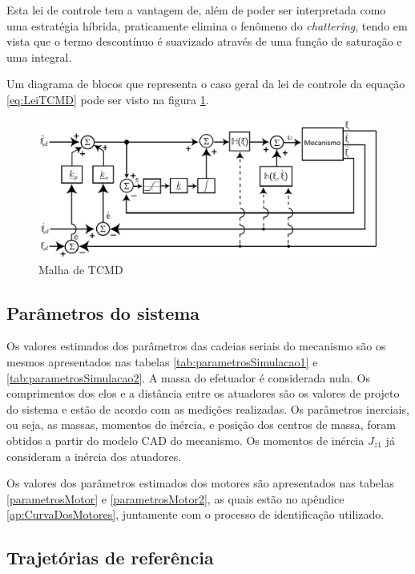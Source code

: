 \documentclass[]{politex}
\begin{document}
Esta lei de controle tem a vantagem de, além de poder ser interpretada como uma estratégia híbrida, praticamente elimina o fenômeno do \emph{chattering}, tendo em vista que o termo descontínuo é suavizado através de uma função de saturação e uma integral.

Um diagrama de blocos que representa o caso geral da lei de controle da equação \eqref{eq:LeiTCMD} pode ser visto na figura \ref{fig:TCMD}.
\begin{figure}[h]
	\centering
	\includegraphics[scale=0.39]{../figures/TCMD.jpg}  
	\caption{Malha de TCMD}
	\label{fig:TCMD}
\end{figure}


\subsection{Parâmetros do sistema}

Os valores estimados dos parâmetros das cadeias seriais do mecanismo são os mesmos apresentados nas tabelas \ref{tab:parametrosSimulacao1} e \ref{tab:parametrosSimulacao2}. A massa do efetuador é considerada nula. Os comprimentos dos elos e a distância entre os atuadores são os valores de projeto do sistema e estão de acordo com as medições realizadas. Os parâmetros inerciais, ou seja, as massas, momentos de inércia, e posição dos centros de massa, foram obtidos a partir do modelo CAD do mecanismo. Os momentos de inércia $J_{z1}$ já consideram a inércia dos atuadores.

Os valores dos parâmetros estimados dos motores são apresentados nas tabelas \ref{parametrosMotor} e \ref{parametrosMotor2}, as quais estão no apêndice \ref{ap:CurvaDosMotores}, juntamente com o processo de identificação utilizado.

\subsection{Trajetórias de referência}
\end{document}
